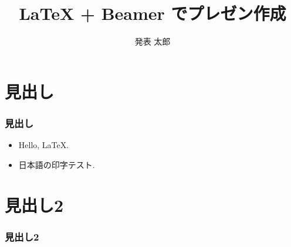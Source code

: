\documentclass[dvipdfmx, 14pt]{beamer}
\title{LaTeX + Beamer でプレゼン作成}
\subtitle{}
\author{発表 太郎}
\institute{◯◯学科 ◯◯研究室}
\date{}
\begin{document}
\begin{frame}[plain]
  \frametitle{}
  \titlepage %
\end{frame}

\frame{\tableofcontents[hideallsubsections]} %
\section{見出し}
\begin{frame}
  \frametitle{見出し}

  \begin{itemize}
    \item Hello, \LaTeX.
    \item 日本語の印字テスト.
  \end{itemize}

\end{frame}

\section{見出し2}
\begin{frame}
  \frametitle{見出し2}

\end{frame}

%
%
%
\end{document}
